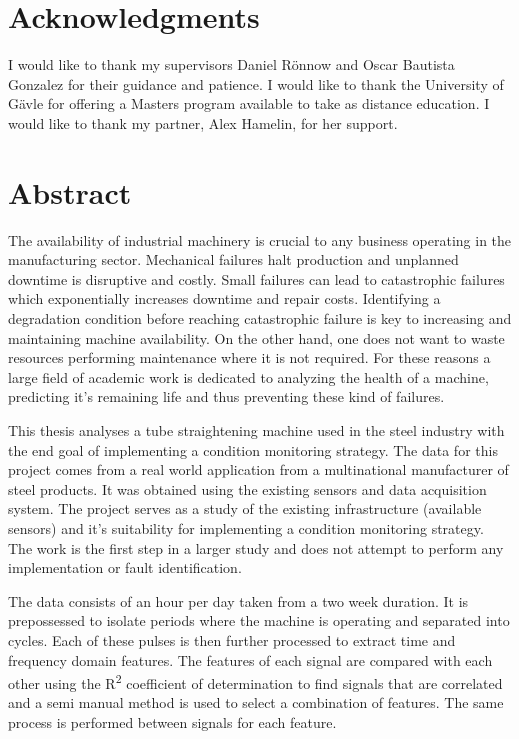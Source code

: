 \documentclass[]{article}
\begin{document}
\setmainfont{Perpetua}

\newpage
\thispagestyle{empty}
\mbox{}
\newpage
{}

\section*{Acknowledgments}
I would like to thank my supervisors Daniel Rönnow and Oscar Bautista Gonzalez for their guidance and patience. I would like to thank the University of Gävle for offering a Masters program available to take as distance education. I would like to thank my partner, Alex Hamelin, for her support.
\newpage

\section*{Abstract}
The availability of industrial machinery  is crucial to any business operating in the manufacturing sector. Mechanical failures halt production and unplanned downtime is disruptive and costly. Small failures can lead to catastrophic failures which exponentially increases downtime and repair costs. Identifying a degradation condition before reaching catastrophic failure is key to increasing and maintaining machine availability. On the other hand, one does not want to waste resources performing maintenance where it is not required. For these reasons a large field of academic work is dedicated to analyzing the health of a machine, predicting it's remaining life and thus preventing these kind of failures.

This thesis analyses a tube straightening machine used in the steel industry with the end goal of implementing a condition monitoring strategy. The data for this project comes from a real world application from a multinational manufacturer of steel products. It was obtained using the existing sensors and data acquisition system. The project serves as a study of the existing infrastructure (available sensors) and it's suitability for implementing a condition monitoring strategy. The work is the first step in a larger study and does not attempt to perform any implementation or fault identification.

The data consists of an hour per day taken from a two week duration. It is prepossessed to isolate periods where the machine is operating and separated into cycles. Each of these pulses is then further processed to extract time and frequency domain features. The features of each signal are compared with each other using the R\textsuperscript{2} coefficient of determination to find signals that are correlated and a semi manual method is used to select a combination of features. The same process is performed between signals for each feature. 
\end{document}
